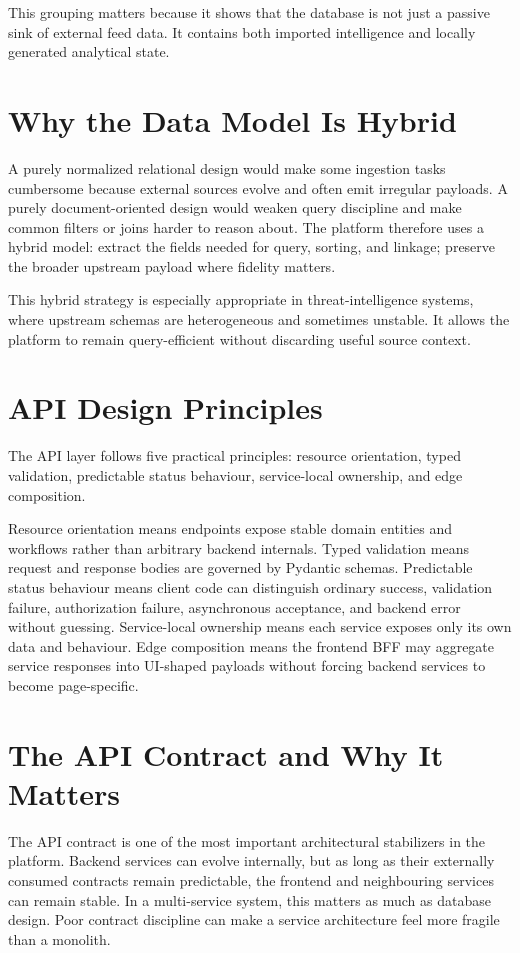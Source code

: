 This grouping matters because it shows that the database is not just a passive sink of external feed data. It contains both imported intelligence and locally generated analytical state.

\section{Why the Data Model Is Hybrid}
A purely normalized relational design would make some ingestion tasks cumbersome because external sources evolve and often emit irregular payloads. A purely document-oriented design would weaken query discipline and make common filters or joins harder to reason about. The platform therefore uses a hybrid model: extract the fields needed for query, sorting, and linkage; preserve the broader upstream payload where fidelity matters.

This hybrid strategy is especially appropriate in threat-intelligence systems, where upstream schemas are heterogeneous and sometimes unstable. It allows the platform to remain query-efficient without discarding useful source context.

\section{API Design Principles}
The API layer follows five practical principles: resource orientation, typed validation, predictable status behaviour, service-local ownership, and edge composition.

Resource orientation means endpoints expose stable domain entities and workflows rather than arbitrary backend internals. Typed validation means request and response bodies are governed by Pydantic schemas. Predictable status behaviour means client code can distinguish ordinary success, validation failure, authorization failure, asynchronous acceptance, and backend error without guessing. Service-local ownership means each service exposes only its own data and behaviour. Edge composition means the frontend BFF may aggregate service responses into UI-shaped payloads without forcing backend services to become page-specific.

\section{The API Contract and Why It Matters}
The API contract is one of the most important architectural stabilizers in the platform. Backend services can evolve internally, but as long as their externally consumed contracts remain predictable, the frontend and neighbouring services can remain stable. In a multi-service system, this matters as much as database design. Poor contract discipline can make a service architecture feel more fragile than a monolith.

